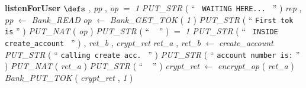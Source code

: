 \bresetindent
%
%
\vspace{-4.5ex}\bsetindent
\begin{tabbing}
\bSetTabs
\+\>
%
%
{\bf { listenForUser}}  \bhsp $\defs$ \+ \bnl
  \+\bnl
{}  , {\em pp\/} , {\em op\/} \- \bhsp {} \+\bnl
{}  $=$ {\em 1\/} \- \bhsp {} \+\bnl
{\em PUT\_STR\/}\label{PUT_STR}  (  `` {\tt
WAITING HERE...
} ''  )  \bStatementSemiColon \bnl
{\em rep\/} , {\em pp\/} $\longleftarrow$ {\em Bank\_READ\/}\label{Bank_READ}  \bStatementSemiColon \bnl
{\em op\/} $\longleftarrow$ {\em Bank\_GET\_TOK\/}\label{Bank_GET_TOK}  ( {\em 1\/} )  \bStatementSemiColon \bnl
{\em PUT\_STR\/}\label{PUT_STR}  (  `` {\tt First tok is} ''  )  \bStatementSemiColon \bnl
{\em PUT\_NAT\/}\label{PUT_NAT}  ( {\em op\/} )  \bStatementSemiColon \bnl
{\em PUT\_STR\/}\label{PUT_STR}  (  `` {\tt
} ''  )  \bStatementSemiColon \bnl
{}  $=$ {\em 1\/} \- \bhsp {} \+\bnl
{\em PUT\_STR\/}\label{PUT_STR}  (  `` {\tt
INSIDE create\_account
} ''  )  \bStatementSemiColon \bnl
{}  , {\em ret\_b\/} , {\em crypt\_ret\/} \- \bhsp {} \+\bnl
{\em ret\_a\/} , {\em ret\_b\/} $\longleftarrow$ {\em create\_account\/}\label{create_account}  \bStatementSemiColon \bnl
{\em PUT\_STR\/}\label{PUT_STR}  (  `` {\tt calling create acc.
} ''  )  \bStatementSemiColon \bnl
{\em PUT\_STR\/}\label{PUT_STR}  (  `` {\tt account number is:} ''  )  \bStatementSemiColon \bnl
{\em PUT\_NAT\/}\label{PUT_NAT}  ( {\em ret\_a\/} )  \bStatementSemiColon \bnl
{\em PUT\_STR\/}\label{PUT_STR}  (  `` {\tt
} ''  )  \bStatementSemiColon \bnl
{\em crypt\_ret\/} $\longleftarrow$ {\em encrypt\_op\/}\label{encrypt_op}  ( {\em ret\_a\/} )  \bStatementSemiColon \bnl
{\em Bank\_PUT\_TOK\/}\label{Bank_PUT_TOK}  ( {\em crypt\_ret\/} , {\em 1\/} )  \bStatementSemiColon \bnl

\end{tabbing}
